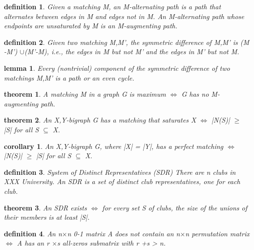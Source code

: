 \documentclass[twocolumn]{article}
\newtheorem{theorem}{theorem}[section]  %
\newtheorem{definition}{definition}
\newtheorem{lemma}{lemma}
\newtheorem{corollary}{corollary}
\begin{document}
\begin{CJK*}{UTF8}{bkai}
    \begin{definition}
        Given a matching M, an M-alternating path is a path that alternates between
 edges in M and edges not in M. An M-alternating path whose endpoints are
 unsaturated by M is an M-augmenting path.
    \end{definition}

    \begin{definition}
        Given two matching M,M', the symmetric difference of M,M' is
 (M -M') $\cup$(M'-M), i.e., the edges in M but not M' and the edges in M'
 but not M.
    \end{definition}

    \begin{lemma}
        Every (nontrivial) component of the symmetric difference of two matchings
 M,M' is a path or an even cycle.
    \end{lemma}

    \begin{theorem}
        A matching M in a graph G is maximum $\iff$ G has no M-augmenting path.
    \end{theorem}

    \begin{theorem}
         An X,Y-bigraph G has a matching that saturates X $\iff$ |N(S)| $\geq$ |S| for all
 S $\subseteq$ X.
    \end{theorem}

    \begin{corollary}
        An X,Y-bigraph G, where |X| = |Y|, has a perfect matching $\iff$ |N(S)| $\geq$ |S|
 for all S $\subseteq$ X.
    \end{corollary}

    \begin{definition}
        System of Distinct Representatives (SDR)
 There are n clubs in XXX University. An SDR is a set of distinct club
 representatives, one for each club.
    \end{definition}

    \begin{theorem}
        An SDR exists $\iff$ for every set S of clubs, the size of the unions of their
 members is at least |S|.
    \end{theorem}

    \begin{definition}
        An n$\times$n 0-1 matrix A does not contain an n$\times$n permutation matrix $\iff$ A
 has an r $\times$s all-zeros submatrix with r +s > n.
    \end{definition}


\end{CJK*}
\end{document}
